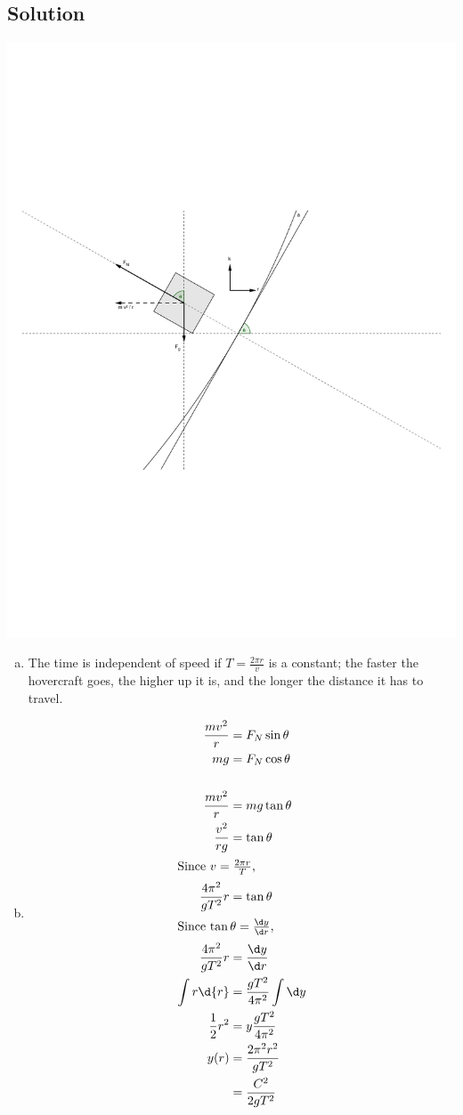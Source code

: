 \documentclass[solutions]{esg8012pset}
\begin{document}
\subsection*{Solution}
  \begin{center}\includegraphics[width=.5\textwidth]{2009-10-02_Diagram_7_2}\end{center}
  \begin{enumerate}[a)]
    \item The time is independent of speed if $T = \frac{2\pi r}{v}$ is a constant; the faster the hovercraft goes, the higher up it is, and the longer the distance it has to travel.
    \item \begin{align*}
      \frac{mv^2}{r} & = F_N\sin\theta \\
      m g & = F_N\cos\theta \\
      \\
      \frac{mv^2}{r} & = m g \tan\theta \\
      \frac{v^2}{r g} & = \tan\theta \\
      \intertext{Since $v = \frac{2\pi r}{T}$,}
      \frac{4\pi^2}{g T^2}r & = \tan\theta \\
      \intertext{Since $\tan\theta = \frac{\d y}{\d r}$,}
      \frac{4\pi^2}{g T^2}r & = \frac{\d y}{\d r} \\
      \int r \d{r} & = \frac{g T^2}{4\pi^2} \int \d y \\
      \frac{1}{2}r^2 & = y\frac{g T^2}{4\pi^2} \\
      y(r) & = \frac{2 \pi^2 r^2}{g T^2} \\
       & = \frac{C^2}{2g T^2}
    \end{align*}
  \end{enumerate}
\end{document}
